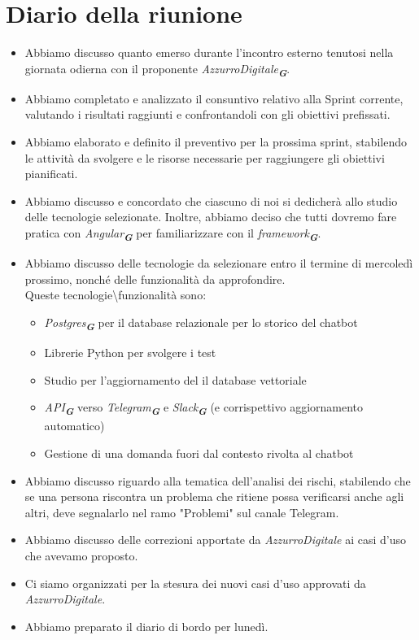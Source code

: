 
\section{Diario della riunione}

\begin{itemize}
    \item Abbiamo discusso quanto emerso durante l'incontro esterno tenutosi nella giornata odierna con il proponente \emph{AzzurroDigitale}\textsubscript{\textit{\textbf{G}}}.
    \item Abbiamo completato e analizzato il consuntivo relativo alla Sprint corrente, valutando i risultati raggiunti e confrontandoli con gli obiettivi prefissati.
    \item Abbiamo elaborato e definito il preventivo per la prossima sprint, stabilendo le attività da svolgere e le risorse necessarie per raggiungere gli obiettivi pianificati.
    \item Abbiamo discusso e concordato che ciascuno di noi si dedicherà allo studio delle tecnologie selezionate. Inoltre, abbiamo deciso che tutti dovremo fare pratica con \emph{Angular}\textsubscript{\textit{\textbf{G}}} per familiarizzare con il \emph{framework}\textsubscript{\textit{\textbf{G}}}.
    \item Abbiamo discusso delle tecnologie da selezionare entro il termine di mercoledì prossimo, nonché delle funzionalità da approfondire. \\    
    Queste tecnologie\textbackslash funzionalità sono:
    \begin{itemize}
        \item \emph{Postgres}\textsubscript{\textit{\textbf{G}}} per il database relazionale per lo storico del chatbot
        \item Librerie Python per svolgere i test
        \item Studio per l'aggiornamento del il database vettoriale
        \item \emph{API}\textsubscript{\textit{\textbf{G}}} verso \emph{Telegram}\textsubscript{\textit{\textbf{G}}} e \emph{Slack}\textsubscript{\textit{\textbf{G}}} (e corrispettivo aggiornamento automatico)
        \item Gestione di una domanda fuori dal contesto rivolta al chatbot
    \end{itemize}

    \item Abbiamo discusso riguardo alla tematica dell'analisi dei rischi, stabilendo che se una persona riscontra un problema che ritiene possa verificarsi anche agli altri, deve segnalarlo nel ramo "Problemi" sul canale Telegram.
    \item Abbiamo discusso delle correzioni apportate da \emph{AzzurroDigitale} ai casi d'uso che avevamo proposto.
    \item Ci siamo organizzati per la stesura dei nuovi casi d'uso approvati da \emph{AzzurroDigitale}.
    \item Abbiamo preparato il diario di bordo per lunedì.
\end{itemize}
